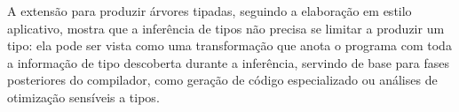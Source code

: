   A extensão para produzir árvores tipadas, seguindo a elaboração em
  estilo aplicativo, mostra que a inferência de tipos não precisa se
  limitar a produzir um tipo: ela pode ser vista como uma transformação
  que anota o programa com toda a informação de tipo descoberta durante
  a inferência, servindo de base para fases posteriores do compilador,
  como geração de código especializado ou análises de otimização
  sensíveis a tipos.
